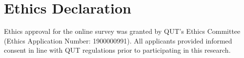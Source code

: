 \documentclass[
doublespace,
  times]{anzsauth}
\begin{document}
\section*{Ethics Declaration}\label{ethics-declaration}

Ethics approval for the online survey was granted by QUT's Ethics
Committee (Ethics Application Number: 1900000991). All applicants
provided informed consent in line with QUT regulations prior to
participating in this research.



\end{document}
